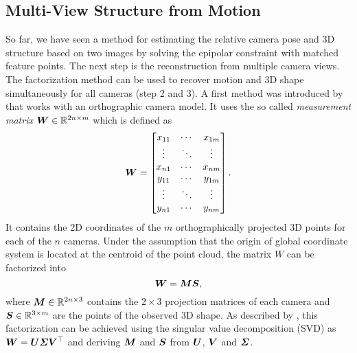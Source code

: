 		\subsection{Multi-View Structure from Motion}
			So far, we have seen a method for estimating the relative camera pose and 3D structure based on two images by solving the epipolar constraint with matched feature points.
			The next step is the reconstruction from multiple camera views.
			The factorization method can be used to recover motion and 3D shape simultaneously for all cameras (step 2 and 3).
			A first method was introduced by \cite{tomasi1992factorization} that works with an orthographic camera model.
			It uses the so called \emph{measurement matrix} $\bm{W} \in \mathbb{R}^{2n \times m}$ which is defined as
			\begin{equation}\label{eq:measurement_matrix}
				\bm{W} =
				\begin{bmatrix}
					x_{11} & \cdots & x_{1m} \\ 
					\vdots & \ddots & \vdots \\ 
					x_{n1} & \cdots & x_{nm} \\ 
					y_{11} & \cdots & y_{1m} \\ 
					\vdots & \ddots & \vdots \\ 
					y_{n1} & \cdots & y_{nm}
				\end{bmatrix}. 
			\end{equation}
			It contains the 2D coordinates of the $m$ orthographically projected 3D points for each of the $n$ cameras.
			Under the assumption that the origin of global coordinate system is located at the centroid of the point cloud, the matrix $W$ can be factorized into
			\begin{equation}\label{eq:factorization_method}
				\bm{W} = \bm{M} \bm{S},
			\end{equation}
			where $\bm{M} \in \mathbb{R}^{2n \times 3}$ contains the $2 \times 3$ projection matrices of each camera and $\bm{S} \in \mathbb{R}^{3 \times m}$  are the points of the observed 3D shape.
			As described by \cite{tomasi1992factorization}, this factorization can be achieved using the singular value decomposition (SVD) as $\bm{W} = \bm{U} \bm{\varSigma} \bm{V}^\top$ and deriving $\bm{M}$ and $\bm{S}$ from $\bm{U}$, $\bm{V}$ and $\bm{\varSigma}$.
			
